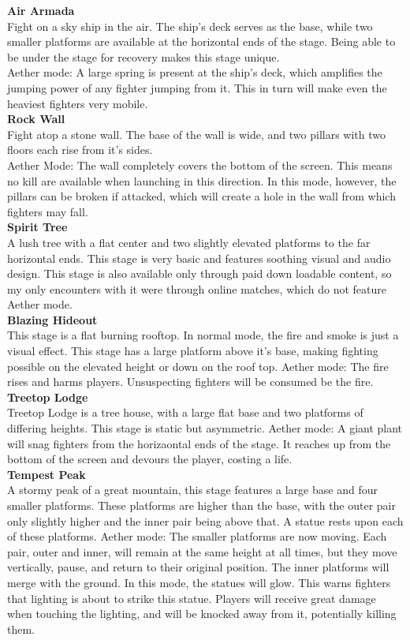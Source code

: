 \documentclass{article}
\begin{document}
\textbf{Air Armada}\\
Fight on a sky ship in the air. The ship's deck serves as the base, while two smaller platforms are available at the horizontal ends of the stage. Being able to be under the stage for recovery makes this stage unique.\\
Aether mode: A large spring is present at the ship's deck, which amplifies the jumping power of any fighter jumping from it. This in turn will make even the heaviest fighters very mobile.
\\
\textbf{Rock Wall}\\
Fight atop a stone wall. The base of the wall is wide, and two pillars with two floors each rise from it's sides.\\
Aether Mode: The wall completely covers the bottom of the screen. This means no kill are available when launching in this direction. In this mode, however, the pillars can be broken if attacked, which will create a hole in the wall from which fighters may fall.\\
\newpage
\textbf{Spirit Tree}\\%
A lush tree with a flat center and two slightly elevated platforms to the far horizontal ends. This stage is very basic and features soothing visual and audio design. This stage is also available only through paid down loadable content, so my only encounters with it were through online matches, which do not feature Aether mode.\\
\textbf{Blazing Hideout}\\
This stage is a flat burning rooftop. In normal mode, the fire and smoke is just a visual effect. This stage has a large platform above it's base, making fighting possible on the elevated height or down on the roof top.
Aether mode: The fire rises and harms players. Unsuspecting fighters will be consumed be the fire.
\\
\textbf{Treetop Lodge}\\
Treetop Lodge is a tree house, with a large flat base and two platforms of differing heights. This stage is static but asymmetric.
Aether mode: A giant plant will snag fighters from the horizaontal ends of the stage. It reaches up from the bottom of the screen and devours the player, costing a life.
\\
\textbf{Tempest Peak}\\
A stormy peak of a great mountain, this stage features a large base and four smaller  platforms. These platforms are higher than the base, with the outer pair only slightly higher and the inner pair being above that. A statue rests upon each of these platforms.
Aether mode: The smaller platforms are now moving. Each pair, outer and inner, will remain at the same height at all times, but they move vertically, pause, and return to their original position. The inner platforms will merge with the ground. In this mode, the statues will glow. This warns fighters that lighting is about to strike this statue. Players will receive great damage when touching the lighting, and will be knocked away from it, potentially killing them.
\\
\end{document}
